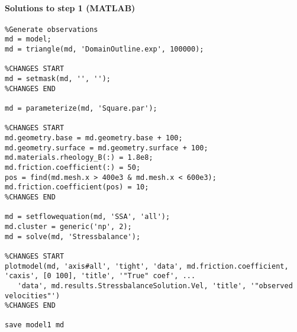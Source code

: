 \paragraph{Solutions to step 1 (MATLAB)}
\begin{lstlisting}
%Generate observations
md = model;
md = triangle(md, 'DomainOutline.exp', 100000);

%CHANGES START
md = setmask(md, '', '');
%CHANGES END

md = parameterize(md, 'Square.par');

%CHANGES START
md.geometry.base = md.geometry.base + 100;
md.geometry.surface = md.geometry.surface + 100;
md.materials.rheology_B(:) = 1.8e8;
md.friction.coefficient(:) = 50;
pos = find(md.mesh.x > 400e3 & md.mesh.x < 600e3);
md.friction.coefficient(pos) = 10;
%CHANGES END

md = setflowequation(md, 'SSA', 'all');
md.cluster = generic('np', 2);
md = solve(md, 'Stressbalance');

%CHANGES START
plotmodel(md, 'axis#all', 'tight', 'data', md.friction.coefficient, 'caxis', [0 100], 'title', '"True" coef', ...
   'data', md.results.StressbalanceSolution.Vel, 'title', '"observed velocities"')
%CHANGES END

save model1 md
\end{lstlisting}

